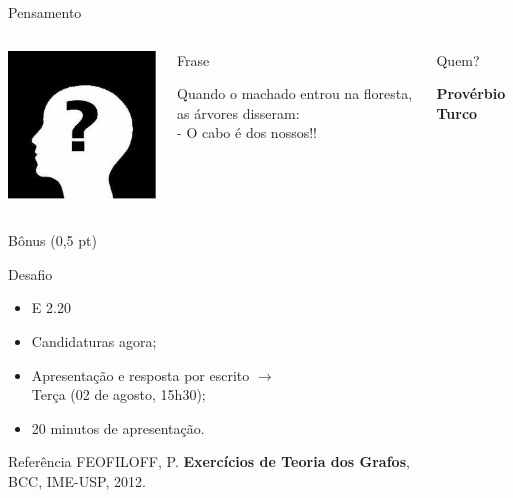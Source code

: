 \documentclass[xcolor=dvipsnames,table]{beamer}
\begin{document}
	\begin{frame}{Pensamento}
		\begin{columns}
		  		\begin{center}
		    		\includegraphics[height=.5\textheight]{images/desconhecido.jpg}
		  		\end{center}
				\begin{block}{Frase}
					\begin{center}
						{\large Quando o machado entrou na floresta, as árvores disseram: \\- O cabo é dos nossos!!}
					\end{center}
				\end{block}		  		
		  		\begin{block}{Quem?}
		  			\begin{center}
						{\bf Provérbio Turco}
					\end{center}
				\end{block}
		\end{columns}
	\end{frame}
    
	\begin{frame}{Bônus (0,5 pt)}
		\begin{block}{Desafio}
			\begin{itemize}
				\item {E 2.20} 
                \item Candidaturas agora; 
                \item Apresentação e resposta por escrito $\rightarrow$ \\Terça (02 de agosto, 15h30); 
                \item 20 minutos de apresentação.
			\end{itemize}
		\end{block}
        \begin{block}{Referência}
			FEOFILOFF, P. {\bf Exercícios de Teoria dos Grafos}, \\
			BCC, IME-USP, 2012. 
		\end{block}	
	\end{frame}    
    
\end{document}
